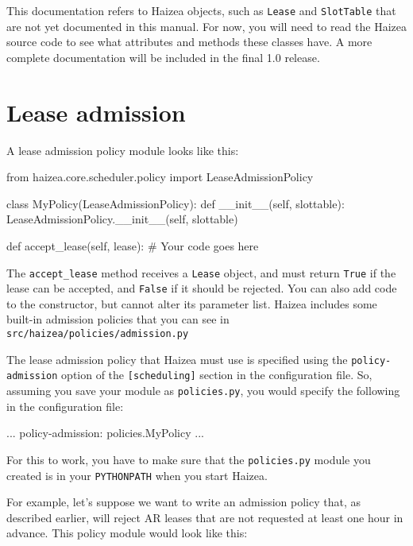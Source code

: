 \begin{warning}
This documentation refers to Haizea objects, such as \texttt{Lease} and \texttt{SlotTable} that are not yet documented in this manual. For now, you will need to read the Haizea source code to see what attributes and methods these classes have. A more complete documentation will be included in the final 1.0 release.
\end{warning}

\section{Lease admission}

A lease admission policy module looks like this:

\begin{wideshellverbatim}
from haizea.core.scheduler.policy import LeaseAdmissionPolicy

class MyPolicy(LeaseAdmissionPolicy):
    def __init__(self, slottable):
        LeaseAdmissionPolicy.__init__(self, slottable)
        
    def accept_lease(self, lease):
        # Your code goes here
\end{wideshellverbatim}

The \texttt{accept\_lease} method receives a \texttt{Lease} object, and must return \texttt{True} if the lease can be accepted, and \texttt{False} if it should be rejected. You can also add code to the constructor, but cannot alter its parameter list. Haizea includes some built-in admission policies that you can see in \texttt{src/haizea/policies/admission.py}

The lease admission policy that Haizea must use is specified using the \texttt{policy-admission} option of the \texttt{[scheduling]} section in the configuration file. So, assuming you save your module as \texttt{policies.py}, you would specify the following in the configuration file:

\begin{wideshellverbatim}
[scheduling]
...
policy-admission: policies.MyPolicy
...
\end{wideshellverbatim}

For this to work, you have to make sure that the \texttt{policies.py} module you created is in your \texttt{PYTHONPATH} when you start Haizea.

For example, let's suppose we want to write an admission policy that, as described earlier, will reject AR leases that are not requested at least one hour in advance. This policy module would look like this:

